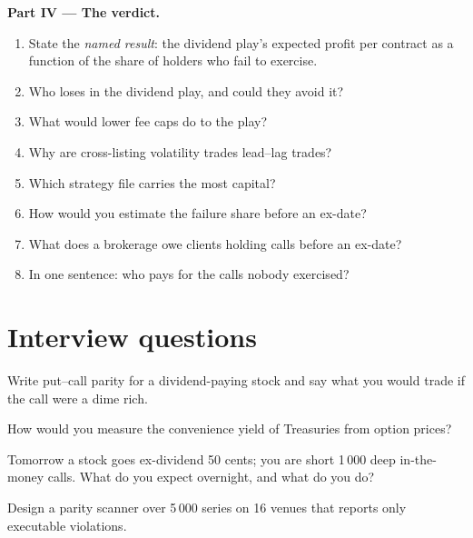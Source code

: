 \begin{problem}
\medskip\noindent\textbf{Part IV --- The verdict.}
\begin{enumerate}[resume]
\item State the \emph{named result}: the dividend play's expected profit per contract as a function of the share of holders who fail to exercise.
\item Who loses in the dividend play, and could they avoid it?
\item What would lower fee caps do to the play?
\item Why are cross-listing volatility trades lead--lag trades?
\item Which strategy file carries the most capital?
\item How would you estimate the failure share before an ex-date?
\item What does a brokerage owe clients holding calls before an ex-date?
\item In one sentence: who pays for the calls nobody exercised?
\end{enumerate}
\end{problem}

\section{Interview questions}

\begin{interviewq}\label{iq:hf:options-cross-venue-and-volatility-arbitrage-at-speed:1}
Write put--call parity for a dividend-paying stock and say what you would trade if the call were a dime rich.
\end{interviewq}

\begin{interviewq}\label{iq:hf:options-cross-venue-and-volatility-arbitrage-at-speed:2}
How would you measure the convenience yield of Treasuries from option prices?
\end{interviewq}

\begin{interviewq}\label{iq:hf:options-cross-venue-and-volatility-arbitrage-at-speed:3}
Tomorrow a stock goes ex-dividend 50 cents; you are short 1\,000 deep in-the-money calls. What do you expect overnight, and what do you do?
\end{interviewq}

\begin{interviewq}\label{iq:hf:options-cross-venue-and-volatility-arbitrage-at-speed:4}
Design a parity scanner over 5\,000 series on 16 venues that reports only executable violations.
\end{interviewq}

